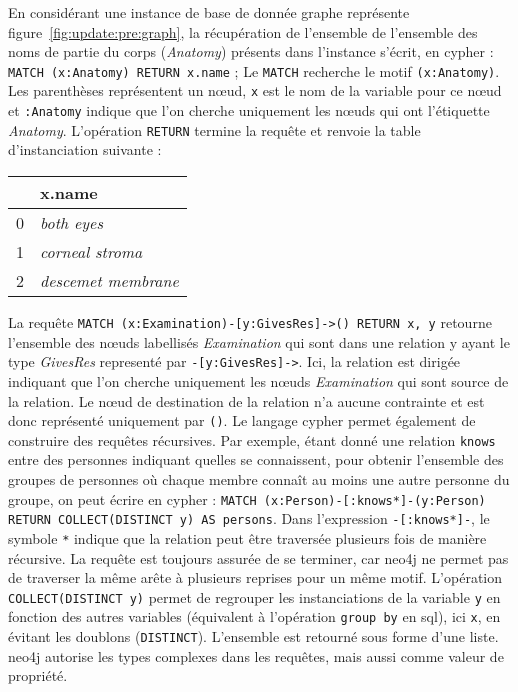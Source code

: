 \begin{example}
    En considérant une instance de base de donnée graphe représente figure~\ref{fig:update:pre:graph}, la récupération de l'ensemble de l'ensemble des noms de partie du corps (\emph{Anatomy}) présents dans l'instance s'écrit, en \gls{cypher} : \verb|MATCH (x:Anatomy) RETURN x.name| ;
    Le \verb|MATCH| recherche le motif \verb|(x:Anatomy)|.
    Les parenthèses représentent un nœud, \verb|x| est le nom de la variable pour ce nœud et \verb|:Anatomy| indique que l'on cherche uniquement les nœuds qui ont l'étiquette \emph{Anatomy}.
    L'opération \verb|RETURN| termine la requête et renvoie la table d'instanciation suivante :

    \begin{center}
        \begin{tabular}{c|l}
              & x.name                   \\
            \hline
            0 & \emph{both eyes}         \\
            1 & \emph{corneal stroma}    \\
            2 & \emph{descemet membrane}
        \end{tabular}
    \end{center}

    La requête \verb|MATCH (x:Examination)-[y:GivesRes]->() RETURN x, y| retourne l'ensemble des nœuds labellisés \emph{Examination} qui sont dans une relation y ayant le type \emph{GivesRes} representé par \verb|-[y:GivesRes]->|.
    Ici, la relation est dirigée indiquant que l'on cherche uniquement les nœuds \emph{Examination} qui sont source de la relation.
    Le nœud de destination de la relation n'a aucune contrainte et est donc représenté uniquement par \verb|()|.
    Le langage \gls{cypher} permet également de construire des requêtes récursives.
    Par exemple, étant donné une relation \verb|knows| entre des personnes indiquant quelles se connaissent, pour obtenir l'ensemble des groupes de personnes où chaque membre connaît au moins une autre personne du groupe, on peut écrire en \gls{cypher} : \verb|MATCH (x:Person)-[:knows*]-(y:Person) RETURN COLLECT(DISTINCT y) AS persons|.
    Dans l'expression \verb|-[:knows*]-|, le symbole \verb|*| indique que la relation peut être traversée plusieurs fois de manière récursive.
    La requête est toujours assurée de se terminer, car \gls{neo4j} ne permet pas de traverser la même arête à plusieurs reprises pour un même motif.
    L'opération \verb|COLLECT(DISTINCT y)| permet de regrouper les instanciations de la variable \verb|y| en fonction des autres variables (équivalent à l'opération \verb|group by| en \gls{sql}), ici \verb|x|, en évitant les doublons (\verb|DISTINCT|).
    L'ensemble est retourné sous forme d'une liste.
    \gls{neo4j} autorise les types complexes dans les requêtes, mais aussi comme valeur de propriété.
\end{example}
